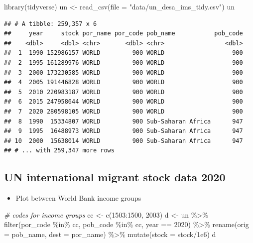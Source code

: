 \documentclass[
]{book}
\newenvironment{Shaded}{\begin{snugshade}}{\end{snugshade}}
\newcommand{\AttributeTok}[1]{\textcolor[rgb]{0.77,0.63,0.00}{#1}}
\newcommand{\CommentTok}[1]{\textcolor[rgb]{0.56,0.35,0.01}{\textit{#1}}}
\newcommand{\DecValTok}[1]{\textcolor[rgb]{0.00,0.00,0.81}{#1}}
\newcommand{\FloatTok}[1]{\textcolor[rgb]{0.00,0.00,0.81}{#1}}
\newcommand{\FunctionTok}[1]{\textcolor[rgb]{0.00,0.00,0.00}{#1}}
\newcommand{\NormalTok}[1]{#1}
\newcommand{\OtherTok}[1]{\textcolor[rgb]{0.56,0.35,0.01}{#1}}
\newcommand{\SpecialCharTok}[1]{\textcolor[rgb]{0.00,0.00,0.00}{#1}}
\newcommand{\StringTok}[1]{\textcolor[rgb]{0.31,0.60,0.02}{#1}}
\providecommand{\tightlist}{%
  \setlength{\itemsep}{0pt}\setlength{\parskip}{0pt}}
\begin{document}
\begin{Shaded}
\begin{Highlighting}[]
\FunctionTok{library}\NormalTok{(tidyverse)}
\NormalTok{un }\OtherTok{\textless{}{-}} \FunctionTok{read\_csv}\NormalTok{(}\AttributeTok{file =} \StringTok{"data/un\_desa\_ims\_tidy.csv"}\NormalTok{)}
\NormalTok{un}
\end{Highlighting}
\end{Shaded}

\begin{verbatim}
## # A tibble: 259,357 x 6
##     year     stock por_name por_code pob_name           pob_code
##    <dbl>     <dbl> <chr>       <dbl> <chr>                 <dbl>
##  1  1990 152986157 WORLD         900 WORLD                   900
##  2  1995 161289976 WORLD         900 WORLD                   900
##  3  2000 173230585 WORLD         900 WORLD                   900
##  4  2005 191446828 WORLD         900 WORLD                   900
##  5  2010 220983187 WORLD         900 WORLD                   900
##  6  2015 247958644 WORLD         900 WORLD                   900
##  7  2020 280598105 WORLD         900 WORLD                   900
##  8  1990  15334807 WORLD         900 Sub-Saharan Africa      947
##  9  1995  16488973 WORLD         900 Sub-Saharan Africa      947
## 10  2000  15638014 WORLD         900 Sub-Saharan Africa      947
## # ... with 259,347 more rows
\end{verbatim}

\hypertarget{un-international-migrant-stock-data-2020-4}{%
\subsection{UN international migrant stock data 2020}\label{un-international-migrant-stock-data-2020-4}}

\begin{itemize}
\tightlist
\item
  Plot between World Bank income groups
\end{itemize}

\begin{Shaded}
\begin{Highlighting}[]
\CommentTok{\# codes for income groups}
\NormalTok{cc }\OtherTok{\textless{}{-}} \FunctionTok{c}\NormalTok{(}\DecValTok{1503}\SpecialCharTok{:}\DecValTok{1500}\NormalTok{, }\DecValTok{2003}\NormalTok{)}
\NormalTok{d }\OtherTok{\textless{}{-}}\NormalTok{ un }\SpecialCharTok{\%\textgreater{}\%}
  \FunctionTok{filter}\NormalTok{(por\_code }\SpecialCharTok{\%in\%}\NormalTok{ cc, }
\NormalTok{         pob\_code }\SpecialCharTok{\%in\%}\NormalTok{ cc,}
\NormalTok{         year }\SpecialCharTok{==} \DecValTok{2020}\NormalTok{) }\SpecialCharTok{\%\textgreater{}\%}
  \FunctionTok{rename}\NormalTok{(}\AttributeTok{orig =}\NormalTok{ pob\_name, }
         \AttributeTok{dest =}\NormalTok{ por\_name) }\SpecialCharTok{\%\textgreater{}\%}
  \FunctionTok{mutate}\NormalTok{(}\AttributeTok{stock =}\NormalTok{ stock}\SpecialCharTok{/}\FloatTok{1e6}\NormalTok{)}
\NormalTok{d}
\end{Highlighting}
\end{Shaded}
\end{document}
